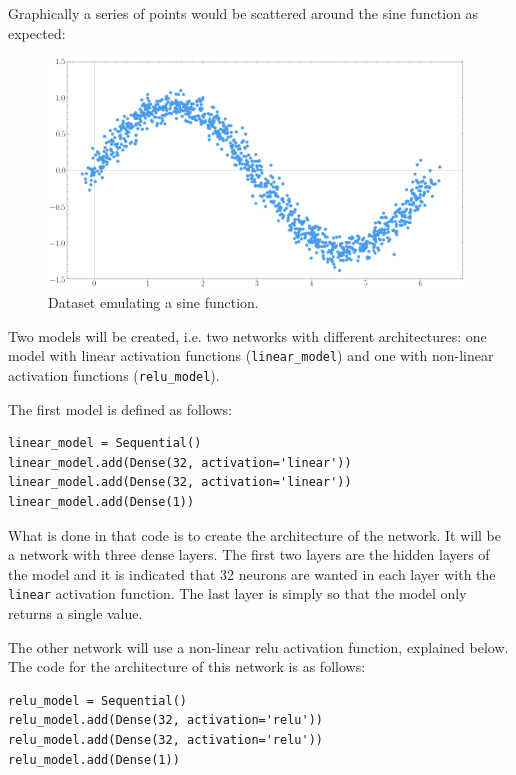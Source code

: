 Graphically a series of points would be scattered around the sine function as expected:
\begin{figure}[H]
    \centering
    \includegraphics[width=11cm]{images/state-of-art/activation-functions/sin.png}
    \caption{Dataset emulating a sine function.}
    \label{fig:basicneuron}
\end{figure}

Two models will be created, i.e. two networks with different architectures: one model with linear activation functions (\small{\verb|linear_model|}\normalsize) and one with non-linear activation functions (\small{\verb|relu_model|}\normalsize).
\newline


The first model is defined as follows:

\begin{verbatim}
linear_model = Sequential()
linear_model.add(Dense(32, activation='linear'))
linear_model.add(Dense(32, activation='linear'))
linear_model.add(Dense(1))
\end{verbatim}

What is done in that code is to create the architecture of the network. It will be a network with three dense layers. The first two layers are the hidden layers of the model and it is indicated that 32 neurons are wanted in each layer with the \small{\verb|linear|} \normalsize  activation function. The last layer is simply so that the model only returns a single value.
\newline

The other network will use a non-linear \acrshort{relu} activation function, explained below.
The code for the architecture of this network is as follows:
\begin{verbatim}
relu_model = Sequential()
relu_model.add(Dense(32, activation='relu'))
relu_model.add(Dense(32, activation='relu'))
relu_model.add(Dense(1))
\end{verbatim}


